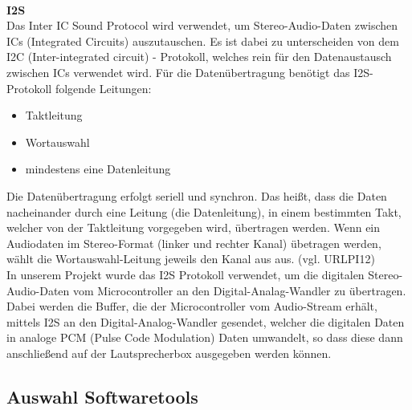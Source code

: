\documentclass[11pt, twoside]{article}
\begin{document}
\newline \\
\textbf{I2S}\\
Das Inter IC Sound Protocol wird verwendet, um Stereo-Audio-Daten zwischen ICs (Integrated Circuits) auszutauschen. Es ist dabei zu unterscheiden von dem I2C (Inter-integrated circuit) - Protokoll, welches rein für den Datenaustausch zwischen ICs verwendet wird. Für die Datenübertragung benötigt das I2S-Protokoll folgende Leitungen:
\begin{itemize}
\item Taktleitung
\item Wortauswahl
\item mindestens eine Datenleitung
\end{itemize}
Die Datenübertragung erfolgt seriell und synchron. Das heißt, dass die Daten nacheinander durch eine Leitung (die Datenleitung), in einem bestimmten Takt, welcher von der Taktleitung vorgegeben wird, übertragen werden. Wenn ein Audiodaten im Stereo-Format (linker und rechter Kanal) übetragen werden, wählt die Wortauswahl-Leitung jeweils den Kanal aus aus. (vgl. URLPI12) \\
In unserem Projekt wurde das I2S Protokoll verwendet, um die digitalen Stereo-Audio-Daten vom Microcontroller an den Digital-Analag-Wandler zu übertragen.
Dabei werden die Buffer, die der Microcontroller vom Audio-Stream erhält, mittels I2S an den Digital-Analog-Wandler gesendet, welcher die digitalen Daten in analoge PCM (Pulse Code Modulation) Daten umwandelt, so dass diese dann anschließend auf der Lautsprecherbox ausgegeben werden können. 
\subsection{Auswahl Softwaretools}
\end{document}
